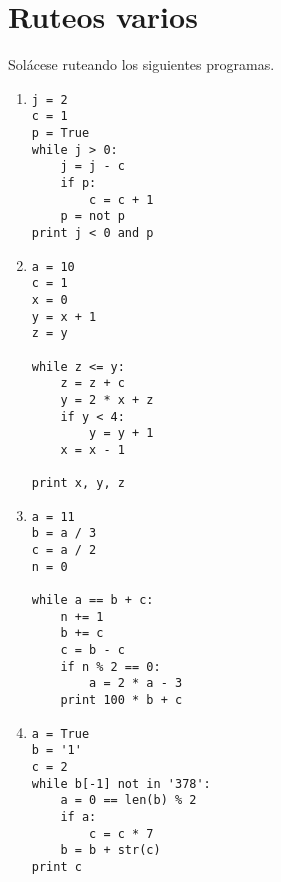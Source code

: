 \section{Ruteos varios}

Solácese ruteando los siguientes programas.

\begin{enumerate}
\item
\begin{lstlisting}
j = 2
c = 1
p = True
while j > 0:
    j = j - c
    if p:
        c = c + 1
    p = not p
print j < 0 and p
\end{lstlisting}

\item
\begin{lstlisting}
a = 10
c = 1
x = 0
y = x + 1
z = y

while z <= y:
    z = z + c
    y = 2 * x + z
    if y < 4:
        y = y + 1
    x = x - 1

print x, y, z
\end{lstlisting}

\item
\begin{lstlisting}
a = 11
b = a / 3
c = a / 2
n = 0

while a == b + c:
    n += 1
    b += c
    c = b - c
    if n % 2 == 0:
        a = 2 * a - 3
    print 100 * b + c
\end{lstlisting}

\item
\begin{lstlisting}
a = True
b = '1'
c = 2
while b[-1] not in '378':
    a = 0 == len(b) % 2
    if a:
        c = c * 7
    b = b + str(c)
print c
\end{lstlisting}
\end{enumerate}
